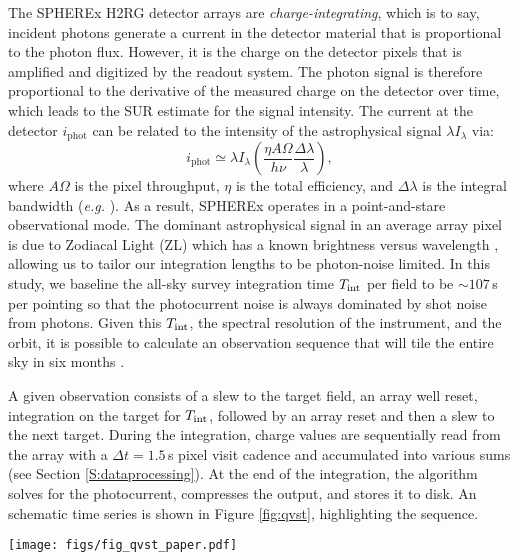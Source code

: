 \documentclass{ws-jai}
\begin{document}
The SPHEREx H2RG detector arrays are \textit{charge-integrating},
which is to say, incident photons generate a current in the detector
material that is proportional to the photon flux.  However, it is the
charge on the detector pixels that is amplified and digitized by the
readout system.  The photon signal is therefore proportional to the
derivative of the measured charge on the detector over time, which
leads to the SUR estimate for the signal intensity.  The current at
the detector $i_{\mathrm{phot}} $ can be related to the intensity of
the astrophysical signal $\lambda I_{\lambda}$ via:
%
\begin{equation}
\label{eq:Iph}
i_{\mathrm{phot}} \simeq \lambda I_{\lambda} \left( \frac{\eta A \Omega}{h \nu}
\frac{\Delta \lambda}{\lambda} \right),
\end{equation}
%
where $A \Omega$ is the pixel throughput, $\eta$ is the total
efficiency, and $\Delta \lambda$ is the integral bandwidth
(\textit{e.g.} \citealt{Bock2013}).  As a result, SPHEREx operates in
a point-and-stare observational mode.  The dominant astrophysical
signal in an average array pixel is due to Zodiacal Light (ZL) which
has a known brightness versus wavelength \citep{Kelsall1998}, allowing
us to tailor our integration lengths to be photon-noise limited.  In
this study, we baseline the all-sky survey integration time
$T_{\rm int}$ per field to be $\sim 107\,$s per pointing so that the
photocurrent noise is always dominated by shot noise from photons.
Given this $T_{\rm int}$, the spectral resolution of the instrument,
and the orbit, it is possible to calculate an observation sequence
that will tile the entire sky in six months \citep{Spangelo2015}.
  
A given observation consists of a slew to the target field, an array
well reset, integration on the target for $T_{\rm int}$, followed by
an array reset and then a slew to the next target.  During the
integration, charge values are sequentially read from the array with a
$\Delta t = 1.5 \,$s pixel visit cadence and accumulated into various
sums (see Section \ref{S:dataprocessing}).  At the end of the
integration, the algorithm solves for the photocurrent, compresses the
output, and stores it to disk.  An schematic time series is shown in
Figure \ref{fig:qvst}, highlighting the sequence.

\begin{figure*}[ht]
\centering
\texttt{[image: figs/fig\_qvst\_paper.pdf]}
\caption{Schematic view of a typical SPHEREx observing sequence.  The
  plot shows the end of an observation (`Int.~A'), a slew to a new
  target, a full $107 \,$s integration (`Int.~B'), a slew to a third
  target, and the beginning of a third integration (`Int. C').  Data
  samples are indicated with a $1.5 \,$s sample rate (black points),
  and the input photocurrent in each section is also shown (red line).
  The steps at the beginning and end of each integration are due to
  detector resets. \label{fig:qvst} }
\end{figure*}
\end{document}

